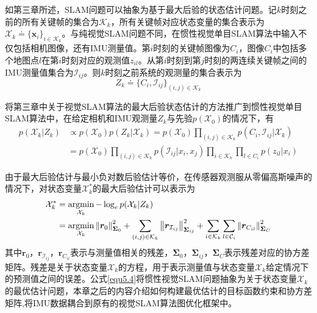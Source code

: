如第三章所述，SLAM问题可以抽象为基于最大后验的状态估计问题。记$k$时刻之前的所有关键帧的集合为$\mathcal{K}_k$，所有关键帧对应状态变量的集合表示为$\mathcal{X}_k \doteq \{\boldsymbol{x}_i\}_{i \in \mathcal{K}_k}$。与纯视觉SLAM问题不同，在惯性视觉单目SLAM算法中输入不仅包括相机图像，还有IMU测量值。第$i$时刻的关键帧图像为$C_i$，图像$C_i$中包括多个地图点$l$在第$i$时刻对应的观测值$z_{il}$。从第$i$时刻到第$j$时刻的两连续关键帧之间的IMU测量值集合为$\mathcal{I}_{ij}$。则$k$时刻之前系统的观测量的集合表示为
\begin{equation}
\label{equ5.2}
Z_k \doteq \{C_i,\mathcal{I}_{ij}\}_{(i,j) \in \mathcal{K}_k}
\end{equation}

将第三章中关于视觉SLAM算法的最大后验状态估计的方法推广到惯性视觉单目SLAM算法中，在给定相机和IMU观测量$Z_k$与先验$p(\mathcal{X}_0)$的情况下，有
\begin{equation}
\label{equ5.3}
\begin{aligned}
p(\mathcal{X}_k | Z_k) & \varpropto p(\mathcal{X}_0)p(Z_k | \mathcal{X}_k) = p(\mathcal{X}_0) \prod\limits_{(i,j) \in \mathcal{K}_k} p \left( C_i,\mathcal{I}_{ij} | \mathcal{X}_k \right) \\
&=p(\mathcal{X}_0) \prod\limits_{(i,j) \in \mathcal{K}_k} p \left( \mathcal{I}_{ij} | x_i,x_j \right) \prod\limits_{i \in \mathcal{K}_k} \prod\limits_{l \in C_i}  p \left( z_{il} | x_i \right)
\end{aligned}
\end{equation}

由于最大后验估计与最小负对数后验估计等价，在传感器观测服从零偏高斯噪声的情况下，对状态变量$\mathcal{X}_k^*$的最大后验估计可以表示为
\begin{equation}
\label{equ5.4}
\begin{aligned}
\mathcal{X}_k^* & = \operatorname*{argmin}\limits_{\mathcal{X}_k}- \log_e p(\mathcal{X}_k | Z_k) \\ 
& = \operatorname*{argmin}\limits_{\mathcal{X}_k} \left\Vert \boldsymbol{r}_0 \right\Vert_{\boldsymbol{\Sigma}_0}^2+ \sum\limits_{(i,j) \in \mathcal{K}_k}\left\Vert \boldsymbol{r}_{\mathcal{I}_{ij}} \right\Vert_{\boldsymbol{\Sigma}_{ij}}^2+ \sum\limits_{i \in \mathcal{K}_k}\sum\limits_{l \in \mathcal{C}_i} \left\Vert \boldsymbol{r}_{C_{il}} \right\Vert_{\boldsymbol{\Sigma}_{C}}^2
\end{aligned}
\end{equation}
其中$\boldsymbol{r}_0$，$ \boldsymbol{r}_{\mathcal{I}_{ij}}$，$\boldsymbol{r}_{C_{il}}$表示与测量值相关的残差，$\boldsymbol{\Sigma}_0$，$ \boldsymbol{\Sigma}_{ij}$，$\boldsymbol{\Sigma}_C$表示残差对应的协方差矩阵。残差是关于状态变量$\mathcal{X}_k$的方程，用于表示测量值与状态变量$\mathcal{X}_k$给定情况下的预测值之间的误差。公式\eqref{equ5.4}将惯性视觉SLAM问题抽象为关于状态变量$\mathcal{X}_k$的最优估计问题，本章之后的内容介绍如何构建最优估计的目标函数约束和协方差矩阵,将IMU数据耦合到原有的视觉SLAM算法图优化框架中。


